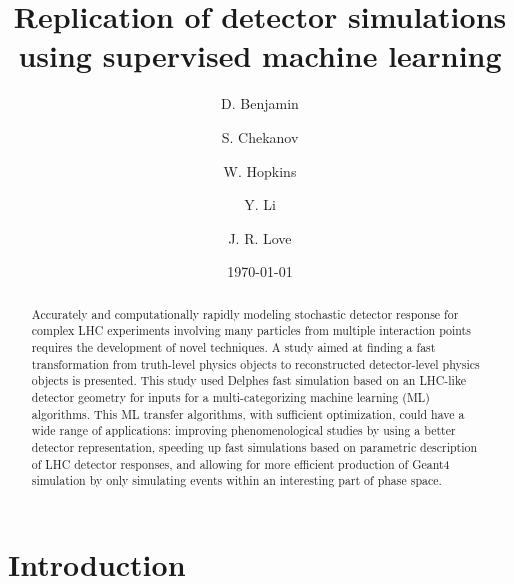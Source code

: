\documentclass[showpacs,showkeys,preprint,prd,nofootinbib,linenumbers,12pt,superscriptaddress]{revtex4-1}
\begin{document}


\date{\today}

\vspace{2.5cm}

\title{
  Replication of detector simulations using supervised machine learning 
}

\author{D. Benjamin}
\author{S. Chekanov}
\author{W. Hopkins}
\author{Y. Li}
\author{J. R. Love}

\begin{abstract}
Accurately and computationally rapidly modeling stochastic detector response for complex LHC experiments involving many particles from multiple interaction points requires the development of novel techniques. A study aimed at finding a fast transformation from truth-level physics objects to reconstructed detector-level physics objects is presented. This study used Delphes fast simulation based on an LHC-like detector geometry for inputs for a multi-categorizing machine learning (ML) algorithms. This ML transfer algorithms, with sufficient optimization, could have a wide range of applications: improving phenomenological studies by using a better detector representation, speeding up fast simulations based on parametric description of LHC detector responses, and allowing for more efficient production of Geant4 simulation by only simulating events within an interesting part of phase space.
\end{abstract}

\maketitle

\section{Introduction}
\end{document}
